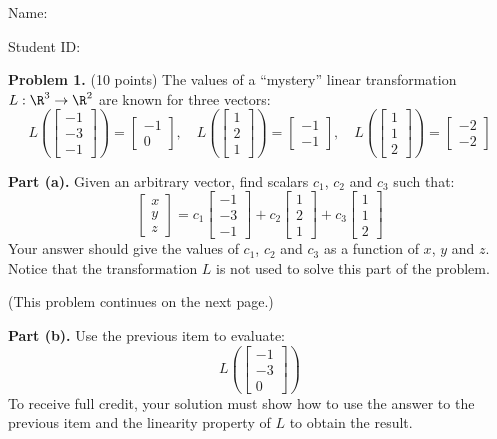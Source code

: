 \documentclass[12pt]{article}
\begin{document}
Name: \hrulefill

\bigskip
Student ID: \hrulefill


\textbf{Problem 1.} (10 points)
The values of a ``mystery'' linear transformation $L:\R^3\to\R^2$ are known for three vectors:
\[
L\left(\left[\begin{matrix}-1\\-3\\-1\end{matrix}\right]\right)=\left[\begin{matrix}-1\\0\end{matrix}\right],\quad 
L\left(\left[\begin{matrix}1\\2\\1\end{matrix}\right]\right)=\left[\begin{matrix}-1\\-1\end{matrix}\right],\quad 
L\left(\left[\begin{matrix}1\\1\\2\end{matrix}\right]\right)=\left[\begin{matrix}-2\\-2\end{matrix}\right]
\]

\textbf{Part (a).} Given an arbitrary vector, find scalars $c_1$, $c_2$ and $c_3$ such that:
\[
\begin{bmatrix}x\\y\\z\end{bmatrix}=c_1\left[\begin{matrix}-1\\-3\\-1\end{matrix}\right]+c_2\left[\begin{matrix}1\\2\\1\end{matrix}\right]+c_3\left[\begin{matrix}1\\1\\2\end{matrix}\right]
\]
Your answer should give the values of $c_1$, $c_2$ and $c_3$ as a function of $x$, $y$ and $z$. Notice that the transformation $L$ is not used to solve this part of the problem.

\vfill
(This problem continues on the next page.)

\clearpage

\textbf{Part (b).} Use the previous item to evaluate:
\[
L\left(\left[\begin{matrix}-1\\-3\\0\end{matrix}\right]\right)
\]
To receive full credit, your solution must show how to use the answer to the previous item and the linearity property of $L$ to obtain the result. 
\end{document}
